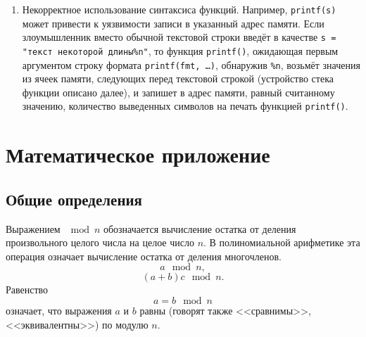 \documentclass[10pt,a4paper,openany]{book}
\begin{document}
\begin{enumerate}
\begin{enumerate}
        \end{enumerate}
    \item Некорректное использование синтаксиса функций. Например, \texttt{printf(s)} может привести к уязвимости записи в указанный адрес памяти. Если злоумышленник вместо обычной текстовой строки введёт в качестве \texttt{s = "текст некоторой длины\%n"}, то функция \texttt{printf()}, ожидающая первым аргументом строку формата \texttt{printf(fmt, \dots)}, обнаружив \texttt{\%n}, возьмёт значения из ячеек памяти, следующих перед текстовой строкой (устройство стека функции описано далее), и запишет в адрес памяти, равный считанному значению, количество выведенных символов на печать функцией \texttt{printf()}.
\end{enumerate}










\appendix
\renewcommand{\thechapter}{\Asbuk{chapter}} %

\chapter{Математическое приложение}\label{chap:discrete-math}

\section{Общие определения}

Выражением $\mod n$ обозначается вычисление остатка от деления произвольного целого числа на целое число $n$. В полиномиальной арифметике эта операция означает вычисление остатка от деления многочленов.
    \[ a\mod n, \]
    \[ (a + b) c\mod n. \]
Равенство
    \[ a = b \mod n \]
означает, что выражения $a$ и $b$ равны (говорят также <<сравнимы>>, <<эквивалентны>>) по модулю $n$.
\end{document}
